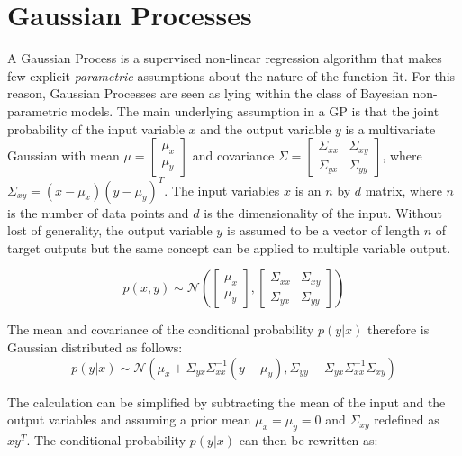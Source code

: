 \documentclass[useAMS,usenatbib,fleqn]{mn2e}
\begin{document}
\section{Gaussian Processes}
\label{sec-gaussian-process}

A Gaussian Process is a supervised non-linear regression algorithm that makes few explicit \emph{parametric} assumptions about the nature of the function fit. For this reason, Gaussian Processes are seen as lying within the class of Bayesian non-parametric models. The main underlying assumption in a GP is that the joint probability of the input variable $x$ and the output variable $y$ is a multivariate Gaussian with mean $\mu=\begin{bmatrix} \mu_{x}\\ \mu_{y}\end{bmatrix}$ and covariance $\Sigma=\begin{bmatrix}\Sigma_{xx} & \Sigma_{xy}\\\Sigma_{yx} & \Sigma_{yy} \end{bmatrix}$, where $\Sigma_{xy}=(x-\mu_{x})(y-\mu_{y})^{T}$. The input variables $x$ is an $n$ by $d$ matrix, where $n$ is the number of data points and $d$ is the dimensionality of the input. Without lost of generality, the output variable $y$ is assumed to be a vector of length $n$ of target outputs but the same concept can be applied to multiple variable output.

\begin{equation}
p\left ( x,y\right) \sim \mathcal{N} \left ( \begin{bmatrix}\mu_{x}\\\mu_{y} \end{bmatrix}, \begin{bmatrix}\Sigma_{xx} & \Sigma_{xy}\\\Sigma_{yx} & \Sigma_{yy} \end{bmatrix}\right )
\end{equation}

The mean and covariance of the conditional probability $p(y|x)$ therefore is Gaussian distributed as follows:
\begin{equation}
p(y|x) \sim  \mathcal{N} \left ( \mu_{x}+\Sigma_{yx}\Sigma_{xx}^{-1}\left ( y-\mu_{y}\right ), \Sigma_{yy}-\Sigma_{yx}\Sigma_{xx}^{-1}\Sigma_{xy}\right )
\end{equation}

The calculation can be simplified by subtracting the mean of the input and the output variables and assuming a prior mean $\mu_{x}=\mu_{y}=0$ and $\Sigma_{xy}$ redefined as $xy^{T}$. The conditional probability $p(y|x)$ can then be rewritten as:
\end{document}
